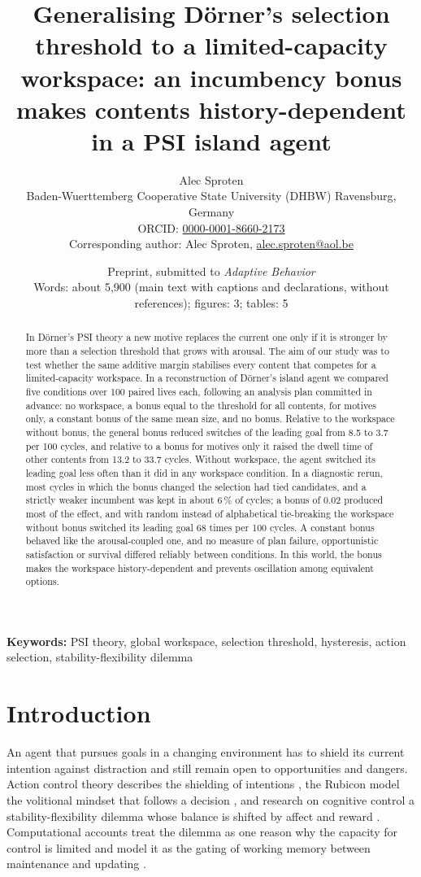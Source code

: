 \documentclass[11pt,a4paper]{article}
\title{Generalising D\"orner's selection threshold to a limited-capacity workspace: an incumbency bonus makes contents history-dependent in a PSI island agent}
\author{Alec Sproten\\[0.5ex]
\small Baden-Wuerttemberg Cooperative State University (DHBW) Ravensburg, Germany\\
\small ORCID: \href{https://orcid.org/0000-0001-8660-2173}{0000-0001-8660-2173}\\[0.5ex]
\small Corresponding author: Alec Sproten, \href{mailto:alec.sproten@aol.be}{alec.sproten@aol.be}}
\date{Preprint, submitted to \emph{Adaptive Behavior}\\[0.5ex]\small Words: about 5{,}900 (main text with captions and declarations, without references); figures: 3; tables: 5}
\begin{document}
\maketitle

\begin{abstract}
In D\"orner's PSI theory a new motive replaces the current one only if it is stronger by more than a selection threshold that grows with arousal. The aim of our study was to test whether the same additive margin stabilises every content that competes for a limited-capacity workspace. In a reconstruction of D\"orner's island agent we compared five conditions over 100 paired lives each, following an analysis plan committed in advance: no workspace, a bonus equal to the threshold for all contents, for motives only, a constant bonus of the same mean size, and no bonus. Relative to the workspace without bonus, the general bonus reduced switches of the leading goal from 8.5 to 3.7 per 100 cycles, and relative to a bonus for motives only it raised the dwell time of other contents from 13.2 to 33.7 cycles. Without workspace, the agent switched its leading goal less often than it did in any workspace condition. In a diagnostic rerun, most cycles in which the bonus changed the selection had tied candidates, and a strictly weaker incumbent was kept in about 6\,\% of cycles; a bonus of 0.02 produced most of the effect, and with random instead of alphabetical tie-breaking the workspace without bonus switched its leading goal 68 times per 100 cycles. A constant bonus behaved like the arousal-coupled one, and no measure of plan failure, opportunistic satisfaction or survival differed reliably between conditions. In this world, the bonus makes the workspace history-dependent and prevents oscillation among equivalent options.
\end{abstract}

\noindent\textbf{Keywords:} PSI theory, global workspace, selection threshold, hysteresis, action selection, stability-flexibility dilemma


\section{Introduction}

An agent that pursues goals in a changing environment has to shield its current intention against distraction and still remain open to opportunities and dangers. Action control theory describes the shielding of intentions \citep{kuhl1985volitional}, the Rubicon model the volitional mindset that follows a decision \citep{heckhausen1987thought}, and research on cognitive control a stability-flexibility dilemma whose balance is shifted by affect and reward \citep{goschke2014emotional,dreisbach2004positive,hommel2015between}. Computational accounts treat the dilemma as one reason why the capacity for control is limited \citep{musslick2021rationalizing} and model it as the gating of working memory between maintenance and updating \citep{oreilly2006making}.
\end{document}
